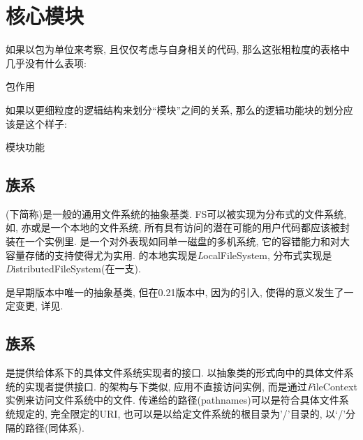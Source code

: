 \section{核心模块}
\label{sec:hfs:modules}

如果以包为单位来考察{\HFS}, 且仅仅考虑与{\HFS}自身相关的代码,
那么这张粗粒度的表格中几乎没有什么表项:
\begin{XeDuoLineTabular}{包}{作用}
\end{XeDuoLineTabular}

如果以更细粒度的逻辑结构来划分``模块''之间的关系, 那么{\HFS}的逻辑功能块的划分应该是这个样子:
\begin{XeDuoLineTabular}{模块}{功能}
\end{XeDuoLineTabular}

\subsection{{\FiS}族系}
\label{ssec:hfs:fs}

{\FiS}(下简称{\FS})是一般的通用文件系统的抽象基类.
FS可以被实现为分布式的文件系统, 如{\HDFS}, 亦或是一个本地的文件系统,
所有具有访问{\HDFS}的潜在可能的用户代码都应该被封装在一个{\FiS}实例里.
{\HDFS}是一个对外表现如同单一磁盘的多机系统,
它的容错能力和对大容量存储的支持使得{\HDFS}尤为实用.
{\FiS}的本地实现是{\emph LocalFileSystem},
分布式实现是{\emph DistributedFileSystem}(在{\HDFS}一支).

{\FiS}是{\HadoopFS}早期版本中唯一的抽象基类, 但在0.21版本中,
因为{\AbsFS}的引入, 使得{\FiS}的意义发生了一定变更,
详见.

\subsection{\AbsFS 族系}
\label{ssec:hfs:afs}

{\AbsFS}是提供给{\HadoopFS}体系下的具体文件系统实现者的接口.
{\AbsFS}以抽象类的形式向{\HadoopFS}中的具体文件系统的实现者提供接口.
{\HadoopFS}的架构与{\Unix}下{\VFS}类似,
应用不直接访问{\AbsFS}实例, 而是通过{\emph FileContext}实例来访问文件系统中的文件.
传递给{\AbsFS}的路径(pathnames)可以是符合具体文件系统规定的, 完全限定的URI,
也可以是以给定文件系统的根目录为'/'目录的, 以‘/’分隔的路径(同{\Unix}体系).

